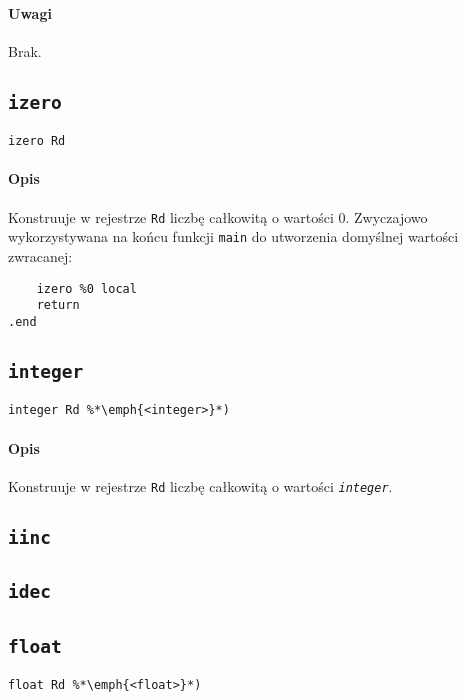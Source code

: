 \paragraph*{Uwagi} Brak.

\subsection{\texttt{izero}}

\begin{lstlisting}
izero Rd
\end{lstlisting}

\paragraph*{Opis} Konstruuje w rejestrze \texttt{Rd} liczbę całkowitą o wartości 0.
Zwyczajowo wykorzystywana na końcu funkcji \texttt{main} do utworzenia domyślnej wartości zwracanej:

\begin{lstlisting}
	izero %0 local
	return
.end
\end{lstlisting}

\subsection{\texttt{integer}}

\begin{lstlisting}
integer Rd %*\emph{<integer>}*)
\end{lstlisting}

\paragraph*{Opis} Konstruuje w rejestrze \texttt{Rd} liczbę całkowitą o wartości \emph{\texttt{integer}}.

\subsection{\texttt{iinc}}
\subsection{\texttt{idec}}

\subsection{\texttt{float}}

\begin{lstlisting}
float Rd %*\emph{<float>}*)
\end{lstlisting}

